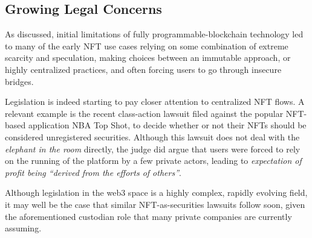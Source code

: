 \subsection{Growing Legal Concerns}\label{summary}

As discussed, initial limitations of fully programmable-blockchain technology
led to many of the early NFT use cases relying on some combination of
extreme scarcity and speculation, making choices between an immutable approach, 
or highly centralized practices, and often forcing users to go through insecure bridges.

Legislation is indeed starting to pay closer attention to centralized NFT flows. A relevant
example is the recent class-action lawsuit filed against the popular NFT-based application 
NBA Top Shot\cite{nba}, to decide whether or not their NFTs should be considered
unregistered securities\cite{dapper-labs-nft-ruling}. Although this lawsuit 
does not deal with the {\it elephant in the room} directly, the judge 
did argue that users were forced to rely on the running of the platform by a few
private actors,
leading to {\it expectation of profit being “derived from the efforts of others”}.

Although legislation in the web3 space is a highly complex, rapidly evolving field,
it may well be the case that similar NFT-as-securities lawsuits follow soon, 
given the aforementioned custodian role that many private companies are currently assuming. 



